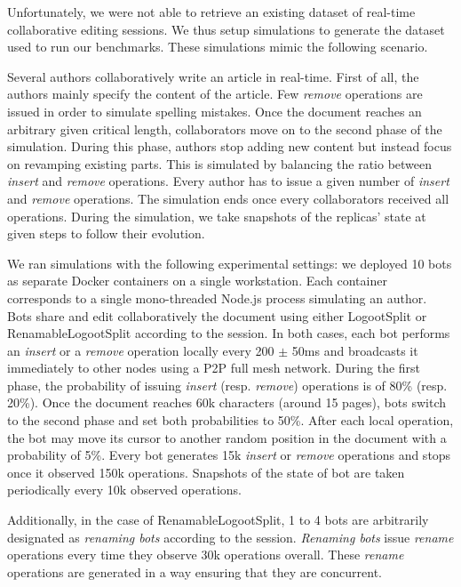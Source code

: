 \documentclass[10pt,journal,compsoc]{IEEEtran}
\begin{document}
Unfortunately, we were not able to retrieve an existing dataset of real-time collaborative editing sessions.
We thus setup simulations to generate the dataset used to run our benchmarks.
These simulations mimic the following scenario.

Several authors collaboratively write an article in real-time.
First of all, the authors mainly specify the content of the article.
Few \emph{remove} operations are issued in order to simulate spelling mistakes.
Once the document reaches an arbitrary given critical length, collaborators move on to the second phase of the simulation.
During this phase, authors stop adding new content but instead focus on revamping existing parts.
This is simulated by balancing the ratio between \emph{insert} and \emph{remove} operations.
Every author has to issue a given number of \emph{insert} and \emph{remove} operations.
The simulation ends once every collaborators received all operations.
During the simulation, we take snapshots of the replicas' state at given steps to follow their evolution.

We ran simulations with the following experimental settings: we deployed 10 bots as separate Docker containers on a single workstation.
Each container corresponds to a single mono-threaded Node.js process simulating an author.
Bots share and edit collaboratively the document using either LogootSplit or RenamableLogootSplit according to the session.
In both cases, each bot performs an \emph{insert} or a \emph{remove} operation locally every 200 $\pm$ 50ms and broadcasts it immediately to other nodes using a \ac{P2P} full mesh network.
During the first phase, the probability of issuing \emph{insert} (resp. \emph{remove}) operations is of 80\% (resp. 20\%).
Once the document reaches 60k characters (around 15 pages), bots switch to the second phase and set both probabilities to 50\%.
After each local operation, the bot may move its cursor to another random position in the document with a probability of 5\%.
Every bot generates 15k \emph{insert} or \emph{remove} operations and stops once it observed 150k operations.
Snapshots of the state of bot are taken periodically every 10k observed operations.

Additionally, in the case of RenamableLogootSplit, 1 to 4 bots are arbitrarily designated as \emph{renaming bots} according to the session.
\emph{Renaming bots} issue \emph{rename} operations every time they observe 30k operations overall.
These \emph{rename} operations are generated in a way ensuring that they are concurrent.
\end{document}
